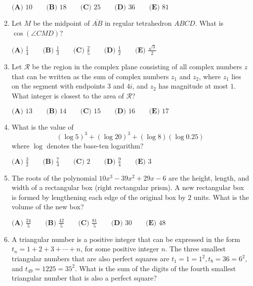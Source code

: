 \documentclass{article}
\begin{document}
\begin{enumerate}[label=\arabic*., itemsep=0.5em]
$\textbf{(A) } 10 \qquad \textbf{(B) } 18 \qquad \textbf{(C) } 25 \qquad \textbf{(D) } 36 \qquad \textbf{(E) } 81$\par \vspace{0.5em}\item Let $M$ be the midpoint of $\overline{AB}$ in regular tetrahedron $ABCD$. What is $\cos(\angle CMD)$?

$\textbf{(A) } \frac14 \qquad \textbf{(B) } \frac13 \qquad \textbf{(C) } \frac25 \qquad \textbf{(D) } \frac12 \qquad \textbf{(E) } \frac{\sqrt{3}}{2}$\par \vspace{0.5em}\item Let $\mathcal{R}$ be the region in the complex plane consisting of all complex numbers $z$ that can be written as the sum of complex numbers $z_1$ and $z_2$, where $z_1$ lies on the segment with endpoints $3$ and $4i$, and $z_2$ has magnitude at most $1$. What integer is closest to the area of $\mathcal{R}$?  

$\textbf{(A) } 13 \qquad \textbf{(B) } 14 \qquad \textbf{(C) } 15 \qquad \textbf{(D) } 16 \qquad \textbf{(E) } 17$\par \vspace{0.5em}\item What is the value of 
\begin{equation*}
(\log 5)^3+(\log 20)^3+(\log 8)(\log 0.25)
\end{equation*}
 where $\log$ denotes the base-ten logarithm?

$\textbf{(A) } \frac{3}{2} \qquad \textbf{(B) } \frac{7}{4} \qquad \textbf{(C) } 2 \qquad \textbf{(D) } \frac{9}{4} \qquad \textbf{(E) } 3$\par \vspace{0.5em}\item The roots of the polynomial $10x^3-39x^2+29x-6$ are the height, length, and width of a rectangular box (right rectangular prism). A new rectangular box is formed by lengthening each edge of the original box by $2$ units. What is the volume of the new box?

$\textbf{(A) } \frac{24}{5} \qquad \textbf{(B) } \frac{42}{5} \qquad \textbf{(C) } \frac{81}{5} \qquad \textbf{(D) } 30 \qquad \textbf{(E) } 48$\par \vspace{0.5em}\item A triangular number is a positive integer that can be expressed in the form $t_n=1+2+3+\cdots+n$, for some positive integer $n$. The three smallest triangular numbers that are also perfect squares are $t_1=1=1^2, t_8=36=6^2,$ and $t_{49}=1225=35^2$. What is the sum of the digits of the fourth smallest triangular number that is also a perfect square?


\end{enumerate}
\end{document}
